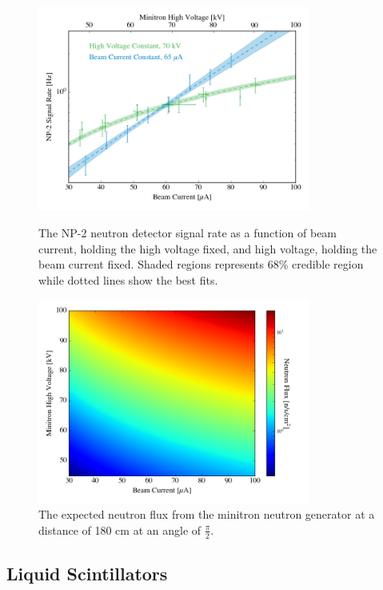 \begin{figure}[p]
	\centering
	\includegraphics[width=0.8\textwidth]{nerix_minitron_fits}
	\caption{The NP-2 neutron detector signal rate as a function of beam current, holding the high voltage fixed, and high voltage, holding the beam current fixed.  Shaded regions represents 68\% credible region while dotted lines show the best fits.}
	\label{fig:nerix_minitron_fits}

        \vspace{\floatsep}

	\centering
	\includegraphics[width=0.8\textwidth]{nerix_minitron_rate}
	\caption{The expected neutron flux from the minitron neutron generator at a distance of 180 cm at an angle of $\frac{\pi}{2}$.}
	\label{fig:nerix_minitron_rate}
\end{figure}



\subsection{Liquid Scintillators}

